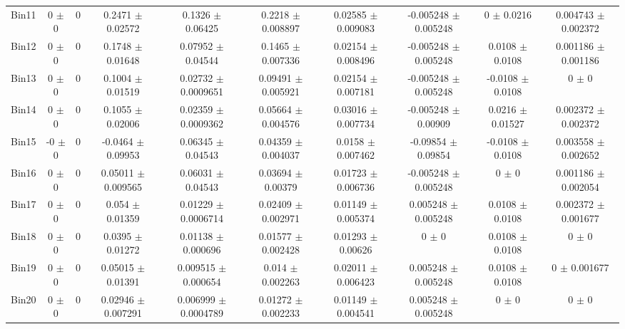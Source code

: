 \begin{tabular}{@{\extracolsep{4pt}}lccccccccc@{}}
     Bin11 & 0 $\pm$ 0 & 0 & 0.2471 $\pm$ 0.02572 & 0.1326 $\pm$ 0.06425 & 0.2218 $\pm$ 0.008897 & 0.02585 $\pm$ 0.009083 & -0.005248 $\pm$ 0.005248 & 0 $\pm$ 0.0216 & 0.004743 $\pm$ 0.002372 \\ 
     Bin12 & 0 $\pm$ 0 & 0 & 0.1748 $\pm$ 0.01648 & 0.07952 $\pm$ 0.04544 & 0.1465 $\pm$ 0.007336 & 0.02154 $\pm$ 0.008496 & -0.005248 $\pm$ 0.005248 & 0.0108 $\pm$ 0.0108 & 0.001186 $\pm$ 0.001186 \\ 
     Bin13 & 0 $\pm$ 0 & 0 & 0.1004 $\pm$ 0.01519 & 0.02732 $\pm$ 0.0009651 & 0.09491 $\pm$ 0.005921 & 0.02154 $\pm$ 0.007181 & -0.005248 $\pm$ 0.005248 & -0.0108 $\pm$ 0.0108 & 0 $\pm$ 0 \\ 
     Bin14 & 0 $\pm$ 0 & 0 & 0.1055 $\pm$ 0.02006 & 0.02359 $\pm$ 0.0009362 & 0.05664 $\pm$ 0.004576 & 0.03016 $\pm$ 0.007734 & -0.005248 $\pm$ 0.00909 & 0.0216 $\pm$ 0.01527 & 0.002372 $\pm$ 0.002372 \\ 
     Bin15 & -0 $\pm$ 0 & 0 & -0.0464 $\pm$ 0.09953 & 0.06345 $\pm$ 0.04543 & 0.04359 $\pm$ 0.004037 & 0.0158 $\pm$ 0.007462 & -0.09854 $\pm$ 0.09854 & -0.0108 $\pm$ 0.0108 & 0.003558 $\pm$ 0.002652 \\ 
     Bin16 & 0 $\pm$ 0 & 0 & 0.05011 $\pm$ 0.009565 & 0.06031 $\pm$ 0.04543 & 0.03694 $\pm$ 0.00379 & 0.01723 $\pm$ 0.006736 & -0.005248 $\pm$ 0.005248 & 0 $\pm$ 0 & 0.001186 $\pm$ 0.002054 \\ 
     Bin17 & 0 $\pm$ 0 & 0 & 0.054 $\pm$ 0.01359 & 0.01229 $\pm$ 0.0006714 & 0.02409 $\pm$ 0.002971 & 0.01149 $\pm$ 0.005374 & 0.005248 $\pm$ 0.005248 & 0.0108 $\pm$ 0.0108 & 0.002372 $\pm$ 0.001677 \\ 
     Bin18 & 0 $\pm$ 0 & 0 & 0.0395 $\pm$ 0.01272 & 0.01138 $\pm$ 0.000696 & 0.01577 $\pm$ 0.002428 & 0.01293 $\pm$ 0.00626 & 0 $\pm$ 0 & 0.0108 $\pm$ 0.0108 & 0 $\pm$ 0 \\ 
     Bin19 & 0 $\pm$ 0 & 0 & 0.05015 $\pm$ 0.01391 & 0.009515 $\pm$ 0.000654 & 0.014 $\pm$ 0.002263 & 0.02011 $\pm$ 0.006423 & 0.005248 $\pm$ 0.005248 & 0.0108 $\pm$ 0.0108 & 0 $\pm$ 0.001677 \\ 
     Bin20 & 0 $\pm$ 0 & 0 & 0.02946 $\pm$ 0.007291 & 0.006999 $\pm$ 0.0004789 & 0.01272 $\pm$ 0.002233 & 0.01149 $\pm$ 0.004541 & 0.005248 $\pm$ 0.005248 & 0 $\pm$ 0 & 0 $\pm$ 0 \\ 
\hline\hline
  \end{tabular}
